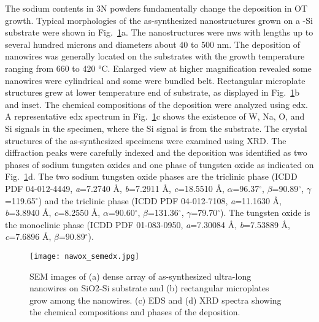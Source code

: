 The sodium contents in 3N powders fundamentally change the deposition in OT growth. Typical morphologies of the as-synthesized nanostructures grown on a -Si substrate were shown in Fig.~\ref{fig:nawoxsemedx}a. The nanostructures were \glspl{nw} with lengths up to several hundred microns and diameters about 40 to 500 nm. The deposition of nanowires was generally located on the substrates with the growth temperature ranging from 660 to 420 \si{\degreeCelsius}. Enlarged view at higher magnification revealed some nanowires were cylindrical and some were bundled belt. Rectangular microplate structures grew at lower temperature end of substrate, as displayed in Fig.~\ref{fig:nawoxsemedx}b and inset. The chemical compositions of the deposition were analyzed using \gls{edx}. A representative \gls{edx} spectrum in Fig.~\ref{fig:nawoxsemedx}c shows the existence of W, Na, O, and Si signals in the specimen, where the Si signal is from the substrate. The crystal structures of the as-synthesized specimens were examined using XRD. The diffraction peaks were carefully indexed and the deposition was identified as two phases of sodium tungsten oxides and one phase of tungsten oxide as indicated on Fig.~\ref{fig:nawoxsemedx}d. The two sodium tungsten oxide phases are the triclinic  phase (ICDD PDF 04-012-4449, \emph{a}=7.2740 \AA, \emph{b}=7.2911 \AA, \emph{c}=18.5510 \AA, $\alpha$=96.37$^\circ$, $\beta$=90.89$^\circ$, $\gamma$=119.65$^\circ$) and the triclinic  phase (ICDD PDF 04-012-7108, \emph{a}=11.1630 \AA, \emph{b}=3.8940 \AA, \emph{c}=8.2550 \AA, $\alpha$=90.60$^\circ$, $\beta$=131.36$^\circ$, $\gamma$=79.70$^\circ$). The tungsten oxide is the monoclinic  phase (ICDD PDF 01-083-0950, \emph{a}=7.30084 \AA, \emph{b}=7.53889 \AA, \emph{c}=7.6896 \AA, $\beta$=90.89$^\circ$).

\begin{figure}[htb]
\centering
\texttt{[image: nawox\_semedx.jpg]}
\caption[SEM and EDX on ]{SEM images of (a) dense array of as-synthesized ultra-long nanowires on SiO2-Si substrate and (b) rectangular microplates grow among the nanowires. (c) EDS and (d) XRD spectra showing the chemical compositions and phases of the deposition.}
\label{fig:nawoxsemedx}
\end{figure}

